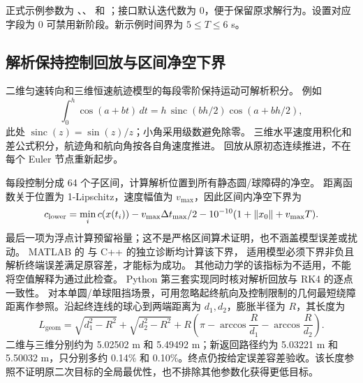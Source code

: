 正式示例参数为 、、 和 ；接口默认迭代数为 0，便于保留原求解行为。设置对应字段为 0 可禁用新阶段。新示例时间界为 $5\le T\le6$ s。

\subsection{解析保持控制回放与区间净空下界}
二维匀速转向和三维恒速航迹模型的每段零阶保持运动可解析积分。
例如
\[
 \int_0^h\cos(a+bt)\,dt=h\,\operatorname{sinc}(bh/2)\cos(a+bh/2),
\]
此处 $\operatorname{sinc}(z)=\sin(z)/z$；小角采用级数避免除零。
三维水平速度用积化和差公式积分，航迹角和航向角按各自角速度推进。
回放从原初态连续推进，不在每个 Euler 节点重新起步。

每段控制分成 64 个子区间，计算解析位置到所有静态圆/球障碍的净空。
距离函数关于位置为 1-Lipschitz，速度幅值为 $v_{\max}$，因此区间内净空下界为
\[
 c_{\rm lower}=\min_i c(x(t_i))-v_{\max}\Delta t_{\max}/2
 -10^{-10}(1+\|x_0\|+v_{\max}T).
\]
最后一项为浮点计算预留裕量；这不是严格区间算术证明，也不涵盖模型误差或扰动。
MATLAB 的  与 C++ 的独立诊断均计算该下界，
适用模型必须下界非负且解析终端误差满足原容差，才能标为成功。
其他动力学的该指标为不适用，不能将空值解释为通过此检查。
Python 第三套实现同时核对解析回放与 RK4 的逐点一致性。
对本单圆/单球阻挡场景，可用忽略起终航向及控制限制的几何最短绕障距离作参照。沿起终连线的球心到两端距离为 $d_1,d_2$，膨胀半径为 $R$，其长度为
\[
 L_{\mathrm{geom}}=\sqrt{d_1^2-R^2}+\sqrt{d_2^2-R^2}
 +R\left(\pi-\arccos\frac{R}{d_1}-\arccos\frac{R}{d_2}\right).
\]
二维与三维分别约为 5.02502 m 和 5.49492 m；新返回路径约为 5.03221 m 和 5.50032 m，只分别多约 0.14\% 和 0.10\%。终点仍按给定误差容差验收。该长度参照不证明原二次目标的全局最优性，也不排除其他参数化获得更低目标。
